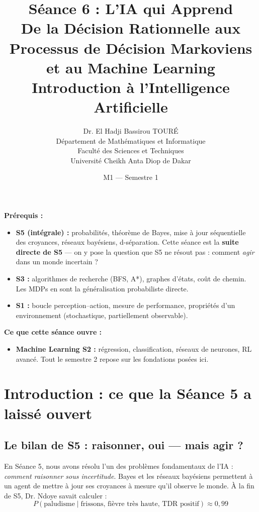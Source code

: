 \documentclass[11pt,a4paper]{article}
\title{\textbf{Séance 6 : L'IA qui Apprend}\\
\large De la Décision Rationnelle aux Processus de Décision Markoviens\\
et au Machine Learning\\[0.5cm]
\normalsize Introduction à l'Intelligence Artificielle}
\author{Dr. El Hadji Bassirou TOURÉ\\
Département de Mathématiques et Informatique\\
Faculté des Sciences et Techniques\\
Université Cheikh Anta Diop de Dakar}
\date{M1 --- Semestre 1}
\begin{document}
\maketitle

\begin{prereqbox}
\textbf{Prérequis :}
\begin{itemize}[nosep]
    \item \textbf{S5 (intégrale) :} probabilités, théorème de Bayes, mise à jour séquentielle des croyances, réseaux bayésiens, d-séparation. Cette séance est la \textbf{suite directe de S5} --- on y pose la question que S5 ne résout pas : comment \textit{agir} dans un monde incertain ?
    \item \textbf{S3 :} algorithmes de recherche (BFS, A*), graphes d'états, coût de chemin. Les MDPs en sont la généralisation probabiliste directe.
    \item \textbf{S1 :} boucle perception--action, mesure de performance, propriétés d'un environnement (stochastique, partiellement observable).
\end{itemize}
\textbf{Ce que cette séance ouvre :}
\begin{itemize}[nosep]
    \item \textbf{Machine Learning S2 :} régression, classification, réseaux de neurones, RL avancé. Tout le semestre 2 repose sur les fondations posées ici.
\end{itemize}
\end{prereqbox}

\vspace{0.4cm}
\tableofcontents
\newpage

\section{Introduction : ce que la Séance 5 a laissé ouvert}

\subsection{Le bilan de S5 : raisonner, oui --- mais agir ?}

En Séance 5, nous avons résolu l'un des problèmes fondamentaux de l'IA : \textit{comment raisonner sous incertitude}. Bayes et les réseaux bayésiens permettent à un agent de mettre à jour ses croyances à mesure qu'il observe le monde. À la fin de S5, Dr. Ndoye savait calculer :
$$P(\text{paludisme} \mid \text{frissons, fièvre très haute, TDR positif}) \approx 0{,}99$$
\end{document}

